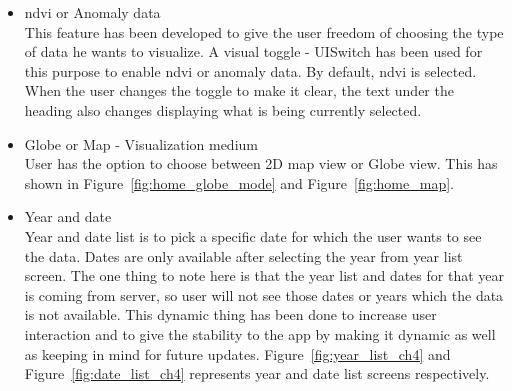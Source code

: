 \begin{itemize}
    \item \gls{ndvi} or Anomaly data \\
    This feature has been developed to give the user freedom of choosing the type of data he wants to visualize. A visual toggle - UISwitch has been used for this purpose to enable \gls{ndvi} or anomaly data. By default, \gls{ndvi} is selected. When the user changes the toggle to make it clear, the text under the heading also changes displaying what is being currently selected. 
  
    \item Globe or Map - Visualization medium \\
    User has the option to choose between 2D map view or Globe view.
    This has shown in Figure~\ref{fig:home_globe_mode} and Figure~\ref{fig:home_map}.

    \item Year and date \\
    Year and date list is to pick a specific date for which the user wants to see the data. Dates are only available after selecting the year from year list screen. The one thing to note here is that the year list and dates for that year is coming from server, so user will not see those dates or years which the data is not available.
    This dynamic thing has been done to increase user interaction and to give the stability to the app by making it dynamic as well as keeping in mind for future updates. Figure~\ref{fig:year_list_ch4} and Figure~\ref{fig:date_list_ch4} represents year and date list screens respectively.
    
    \newpage
    

\end{itemize}
